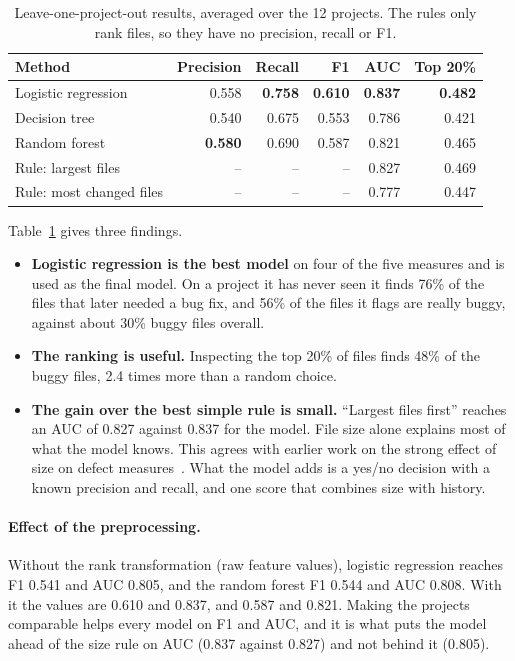 \documentclass[11pt,a4paper]{article}
\begin{document}
\begin{table}[h]
\centering
\begin{tabular}{lrrrrr}
\toprule
Method & Precision & Recall & F1 & AUC & Top 20\% \\
\midrule
Logistic regression & 0.558 & \textbf{0.758} & \textbf{0.610} & \textbf{0.837} & \textbf{0.482} \\
Decision tree & 0.540 & 0.675 & 0.553 & 0.786 & 0.421 \\
Random forest & \textbf{0.580} & 0.690 & 0.587 & 0.821 & 0.465 \\
\midrule
Rule: largest files & -- & -- & -- & 0.827 & 0.469 \\
Rule: most changed files & -- & -- & -- & 0.777 & 0.447 \\
\bottomrule
\end{tabular}
\caption{Leave-one-project-out results, averaged over the 12 projects. The
rules only rank files, so they have no precision, recall or F1.}
\label{tab:methods}
\end{table}

Table~\ref{tab:methods} gives three findings.

\begin{itemize}
\item \textbf{Logistic regression is the best model} on four of the five
      measures and is used as the final model. On a project it has never seen
      it finds 76\% of the files that later needed a bug fix, and 56\% of the
      files it flags are really buggy, against about 30\% buggy files overall.
\item \textbf{The ranking is useful.} Inspecting the top 20\% of files finds
      48\% of the buggy files, 2.4 times more than a random choice.
\item \textbf{The gain over the best simple rule is small.} ``Largest files
      first'' reaches an AUC of 0.827 against 0.837 for the model. File size
      alone explains most of what the model knows. This agrees with earlier
      work on the strong effect of size on defect measures~\cite{elemam}.
      What the model adds is a yes/no decision with a known precision and
      recall, and one score that combines size with history.
\end{itemize}

\paragraph{Effect of the preprocessing.} Without the rank transformation
(raw feature values), logistic regression reaches F1 0.541 and AUC 0.805, and
the random forest F1 0.544 and AUC 0.808. With it the values are 0.610 and
0.837, and 0.587 and 0.821. Making the projects comparable helps every model
on F1 and AUC, and it is what puts the model ahead of the size rule on AUC
(0.837 against 0.827) and not behind it (0.805).
\end{document}
